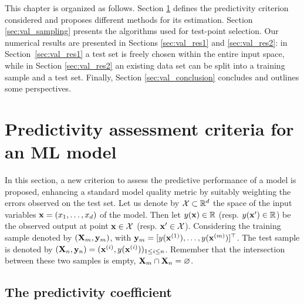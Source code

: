 This chapter is organized as follows. 
Section \ref{sec:q2} defines the predictivity criterion considered and proposes different methods for its estimation. 
Section \ref{sec:val_sampling} presents the algorithms used for test-point selection. 
Our numerical results are presented in Sections \ref{sec:val_res1} and \ref{sec:val_res2}: in Section~\ref{sec:val_res1} a test set is freely chosen within the entire input space, while in Section \ref{sec:val_res2} an existing data set can be split into a training sample and a test set. 
Finally, Section \ref{sec:val_conclusion} concludes and outlines some perspectives.




\section{Predictivity assessment criteria for an ML model}\label{sec:q2}
In this section, a new criterion to assess the predictive performance of a model is proposed, enhancing a standard model quality metric by suitably weighting the errors observed on the test set. 
Let us denote by $\mathcal{X} \subset \mathbb{R}^d$ the space of the input variables ${\bf x}=(x_1,\ldots,x_d)$ of the model. 
Then let $y({\bf x}) \in \mathbb{R}$ (resp. $y({\bf x}') \in \mathbb{R}$) be the observed output at point ${\bf x} \in \mathcal{X}$ (resp. ${\bf x}' \in \mathcal{X}$). 
Considering the training sample denoted by $({\bf X}_m,{\bf y}_m)$, with ${\bf y}_m = [y({\bf x}^{(1)}),\ldots,y({\bf x}^{(m)})]^\top$. 
The test sample is denoted by $({\bf X}_n,{\bf y}_n) = ({\bf x}^{(i)},y({\bf x}^{(i)}))_{1\leq i \leq n}$. 
Remember that the intersection between these two samples is empty, ${\bf X}_m \cap {\bf X}_n = \varnothing$.


\subsection{The predictivity coefficient}

